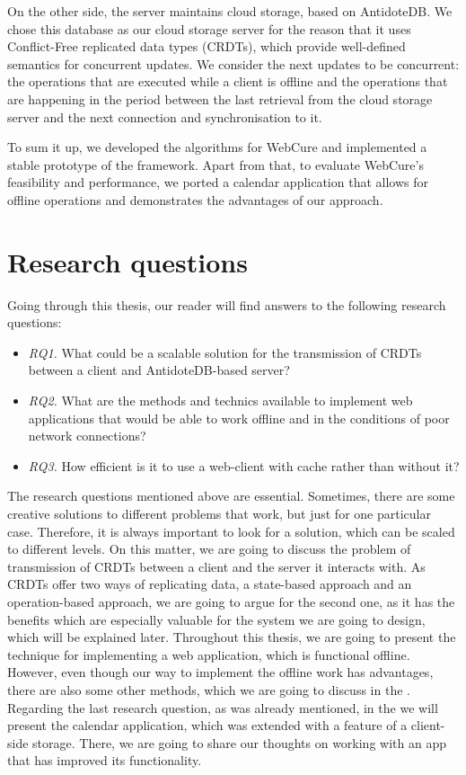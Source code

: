On the other side, the server maintains cloud storage, based on AntidoteDB. We chose this database as our cloud storage server for the reason that it uses Conflict-Free replicated data types (CRDTs), which provide well-defined semantics for concurrent updates. We consider the next updates to be concurrent: the operations that are executed while a client is offline and the operations that are happening in the period between the last retrieval from the cloud storage server and the next connection and synchronisation to it. 

To sum it up, we developed the algorithms for WebCure and implemented a stable prototype of the framework. Apart from that, to evaluate WebCure's feasibility and performance, we ported a calendar application that allows for offline operations and demonstrates the advantages of our approach.

\section{Research questions}
\label{Introduction-Research}

Going through this thesis, our reader will find answers to the following research questions:

\begin{itemize}
    \item \textit{RQ1.} What could be a scalable solution for the transmission of CRDTs between a client and AntidoteDB-based server?
    \item \textit{RQ2.} What are the methods and technics available to implement web applications that would be able to work offline and
    in the conditions of poor network connections?
    \item \textit{RQ3.} How efficient is it to use a web-client with cache rather than without it?
  \end{itemize}

The research questions mentioned above are essential. Sometimes, there are some creative solutions to different problems that work, but just for one particular case. Therefore, it is always important to look for a solution, which can be scaled to different levels. On this matter, we are going to discuss the problem of transmission of CRDTs between a client and the server it interacts with. As CRDTs offer two ways of replicating data, a state-based approach and an operation-based approach, we are going to argue for the second one, as it has the benefits which are especially valuable for the system we are going to design, which will be explained later. Throughout this thesis, we are going to present the technique for implementing a web application, which is functional offline. However, even though our way to implement the offline work has advantages, there are also some other methods, which we are going to discuss in the . Regarding the last research question, as was already mentioned, in the  we will present the calendar application, which was extended with a feature of a client-side storage. There, we are going to share our thoughts on working with an app that has improved its functionality.

